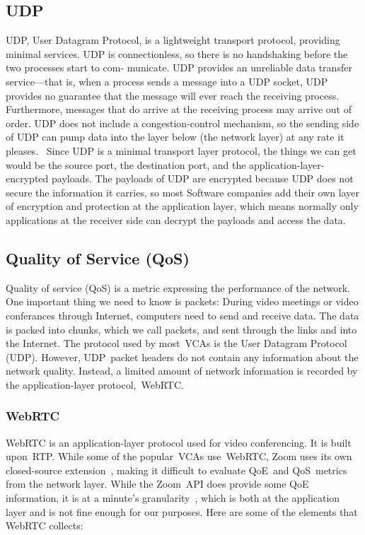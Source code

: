     \subsection{UDP}\label{introduction:qos:udp}
        UDP, User Datagram Protocol, is a lightweight transport protocol, providing minimal services. UDP is connectionless, so there is no handshaking before the two processes start to com- municate. UDP provides an unreliable data transfer service—that is, when a process sends a message into a UDP socket, UDP provides no guarantee that the message will ever reach the receiving process. Furthermore, messages that do arrive at the receiving process may arrive out of order. UDP does not include a congestion-control mechanism, so the sending side of UDP can pump data into the layer below (the network layer) at any rate it pleases.~\autocite{alma990025667610203776} Since UDP is a minimal transport layer protocol, the things we can get would be the source port, the destination port, and the application-layer-encrypted payloads. The payloads of UDP are encrypted because UDP does not secure the information it carries, so most Software companies add their own layer of encryption and protection at the application layer, which means normally only applications at the receiver side can decrypt the payloads and access the data. 


    \subsection{Quality of Service (QoS)}\label{introduction:qos}
        Quality of service (QoS) is a metric expressing the performance of the network. One important thing we need to know is packets: During video meetings or video conferances through Internet, computers need to send and receive data. The data is packed into chunks, which we call packets, and sent through the links and into the Internet. The protocol used by most~VCAs is the User Datagram Protocol (UDP). However, UDP~packet headers do not contain any information about the network quality. Instead, a limited amount of network information is recorded by the application-layer protocol,~WebRTC.

        \subsubsection{WebRTC}\label{introduction:qos:webrtc}
            WebRTC is an application-layer protocol used for video conferencing. It is built upon~RTP. While some of the popular~VCAs use~WebRTC, Zoom uses its own closed-source extension~\autocite{marczak2020}, making it difficult to evaluate QoE~and QoS~metrics from the network layer. While the Zoom~API does provide some QoE information, it is at a minute's granularity~\autocite{walia2019}, which is both at the application layer and is not fine enough for our purposes. Here are some of the elements that WebRTC collects:

